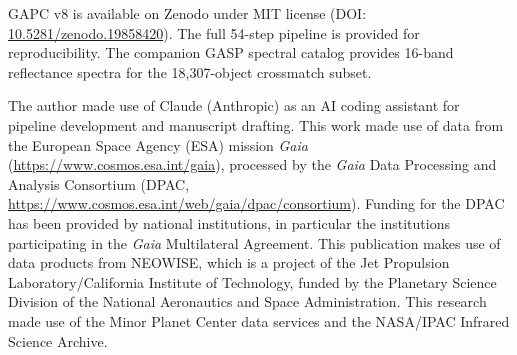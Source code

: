 \documentclass{aa}
\newcommand{\gapc}{GAPC\xspace}
\begin{document}
\gapc v8 is available on Zenodo under MIT license
(DOI: \href{https://doi.org/10.5281/zenodo.19858420}{10.5281/zenodo.19858420}).
The full 54-step pipeline is provided for reproducibility.  The companion
GASP spectral catalog \citep{scheibenpflug2026} provides 16-band reflectance
spectra for the 18,307-object crossmatch subset.

\begin{acknowledgements}
The author made use of Claude (Anthropic) as an AI coding assistant for
pipeline development and manuscript drafting.
This work made use of data from the European Space Agency (ESA) mission
{\it Gaia} (\url{https://www.cosmos.esa.int/gaia}), processed by the {\it
Gaia} Data Processing and Analysis Consortium (DPAC,
\url{https://www.cosmos.esa.int/web/gaia/dpac/consortium}).  Funding for
the DPAC has been provided by national institutions, in particular the
institutions participating in the {\it Gaia} Multilateral Agreement.
This publication makes use of data products from NEOWISE, which is a
project of the Jet Propulsion Laboratory/California Institute of Technology,
funded by the Planetary Science Division of the National Aeronautics and
Space Administration.
This research made use of the Minor Planet Center data services and the
NASA/IPAC Infrared Science Archive.
\end{acknowledgements}



\end{document}
